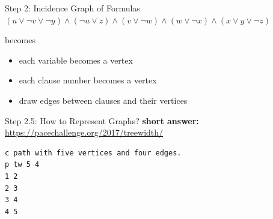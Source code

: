 \documentclass[]{beamer}
\begin{document}
\begin{frame}{Step 2: Incidence Graph of Formulas}
$(u\lor\lnot v\lor\lnot y)\land(\lnot u\lor z)\land(v\lor\lnot w)\land(w\lor\lnot x)\land(x\lor y\lor\lnot z)$

becomes

\begin{minipage}{.4\linewidth}
\end{minipage}
\begin{minipage}{.55\linewidth}
	\begin{itemize}
		\item each variable becomes a vertex
		\item each clause number becomes a vertex
		\item draw edges between clauses and their vertices
	\end{itemize}
\end{minipage}
\end{frame}

\begin{frame}[fragile]{Step 2.5: How to Represent Graphs?}
\textbf{short answer:} \url{https://pacechallenge.org/2017/treewidth/}

\begin{center}
	\begin{verbatim}
c path with five vertices and four edges.
p tw 5 4
1 2
2 3
3 4
4 5
	\end{verbatim}
\end{center}
\end{frame}
\end{document}
